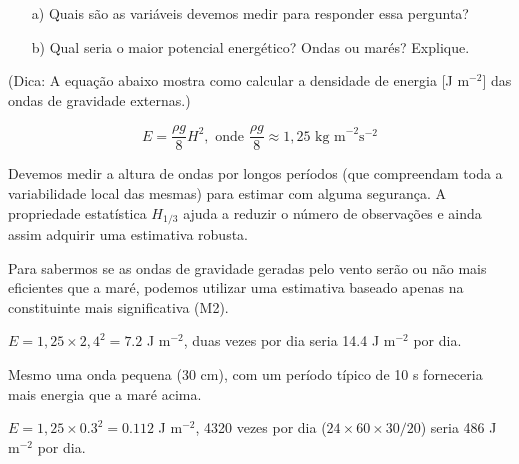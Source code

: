 \documentclass[letterpaper,portuguese,12pt,pdftex]{exam}
\begin{document}
\begin{questions}
\begin{itemize}
  \item[a)] Quais são as variáveis devemos medir para responder essa pergunta?
  \item[b)] Qual seria o maior potencial energético?  Ondas ou marés? Explique.
\end{itemize}

(Dica: A equação abaixo mostra como calcular a densidade de energia [J m$^{-2}$]
das ondas de gravidade externas.)

\[
  E = \dfrac{\rho g}{8} H^2, \text{ onde } \dfrac{\rho g}{8} \approx 1,25 \text{ kg m}^{-2}\text{s}^{-2}
\]

\begin{solution}
  Devemos medir a altura de ondas por longos períodos (que compreendam toda a
  variabilidade local das mesmas) para estimar com alguma segurança.  A
  propriedade estatística $H_{1/3}$ ajuda a reduzir o número de observações e
  ainda assim adquirir uma estimativa robusta.

  Para sabermos se as ondas de gravidade geradas pelo vento serão ou não mais
  eficientes que a maré, podemos utilizar uma estimativa baseado apenas na
  constituinte mais significativa (M2).

  $E = 1,25 \times 2,4^2 = 7.2$ J m$^{-2}$, duas vezes por dia seria
  14.4 J m$^{-2}$ por dia.

  Mesmo uma onda pequena (30 cm), com um período típico de 10 s forneceria mais
  energia que a maré acima.

  $E = 1,25 \times 0.3^2 = 0.112$ J m$^{-2}$, 4320 vezes por dia
  ($24 \times60 \times 30 / 20$) seria 486 J m$^{-2}$ por dia.
\end{solution}

\end{questions}
\end{document}
